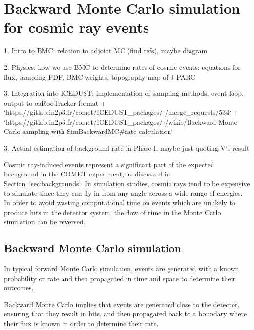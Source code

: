 \chapter{Backward Monte Carlo simulation for cosmic ray events}

\begin{markdown}

1. Intro to BMC: relation to adjoint MC (find refs), maybe diagram

2. Physics: how we use BMC to determine rates of cosmic events: equations for
flux, sampling PDF, BMC weights, topography map of J-PARC

3. Integration into ICEDUST: implementation of sampling methods, event loop, output to
oaRooTracker format
+ `https://gitlab.in2p3.fr/comet/ICEDUST_packages/-/merge_requests/534`
+ `https://gitlab.in2p3.fr/comet/ICEDUST_packages/-/wikis/Backward-Monte-Carlo-sampling-with-SimBackwardMC#rate-calculation`

3. Actual estimation of background rate in Phase-I, maybe just quoting V's
result


\end{markdown}

Cosmic ray-induced events represent a significant part of the expected
background in the COMET experiment, as discussed in
Section~\ref{sec:backgrounds}. In simulation studies, cosmic rays tend to be
expensive to simulate since they can fly in from any angle across a wide range
of energies. In order to avoid wasting computational time on events which are
unlikely to produce hits in the detector system, the flow of time in the Monte
Carlo simulation can be reversed. 

\section{Backward Monte Carlo simulation}
In typical forward Monte Carlo simulation, events are generated with a known
probability or rate and then propagated in time and space to determine their
outcomes. 

Backward Monte Carlo implies that events are generated close to the detector,
ensuring that they result in hits, and then propagated back to a boundary
where their flux is known in order to determine their rate.